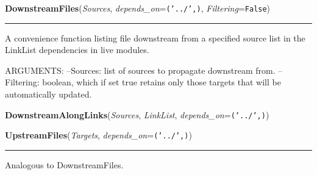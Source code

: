     \label{System:LinkManagement:DownstreamFiles}

    \vspace{0.5ex}

\hspace{.8\funcindent}\begin{boxedminipage}{\funcwidth}

    \raggedright \textbf{DownstreamFiles}(\textit{Sources}, \textit{depends\_on}={\tt ('../',)}, \textit{Filtering}={\tt False})

    \vspace{-1.5ex}

    \rule{\textwidth}{0.5\fboxrule}
\setlength{\parskip}{2ex}
    A convenience function listing file downstream from a specified source 
    list in the LinkList dependencies in live modules.

    ARGUMENTS: --Sources:  list of sources to propagate downstream from. 
    --Filtering: boolean, which if set true retains only those targets that
    will be automatically updated.

\setlength{\parskip}{1ex}
    \end{boxedminipage}

    \label{System:LinkManagement:DownstreamAlongLinks}

    \vspace{0.5ex}

\hspace{.8\funcindent}\begin{boxedminipage}{\funcwidth}

    \raggedright \textbf{DownstreamAlongLinks}(\textit{Sources}, \textit{LinkList}, \textit{depends\_on}={\tt ('../',)})

\setlength{\parskip}{2ex}
\setlength{\parskip}{1ex}
    \end{boxedminipage}

    \label{System:LinkManagement:UpstreamFiles}

    \vspace{0.5ex}

\hspace{.8\funcindent}\begin{boxedminipage}{\funcwidth}

    \raggedright \textbf{UpstreamFiles}(\textit{Targets}, \textit{depends\_on}={\tt ('../',)})

    \vspace{-1.5ex}

    \rule{\textwidth}{0.5\fboxrule}
\setlength{\parskip}{2ex}
    Analogous to DownstreamFiles.

\setlength{\parskip}{1ex}
    \end{boxedminipage}

